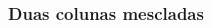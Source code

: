 \documentclass[aspectratio=169]{beamer}
\begin{document}
\begin{frame}[fragile] \frametitle{Duas colunas mescladas}
\vspace{-2em}
\begin{columns}[t]
\begin{column}{0.64\linewidth}
  \vskip6pt
  \begin{exampleblock}{}
  \end{exampleblock}
  \begin{columns}[t]
  \begin{column}{0.48\linewidth}
    \begin{block}{\lipsum[2][12]}
      \lipsum[3][1]
    \end{block}
  \end{column}
  \begin{column}{0.48\linewidth}
    \begin{block}{\lipsum[3][2]}
      \lipsum[3][3]
    \end{block}
  \end{column}
  \end{columns}
\end{column}
\begin{column}{0.32\linewidth}
  \begin{block}{\lipsum[3][4]}
    \lipsum[3][5-9]
  \end{block}
\end{column}
\end{columns}
\end{frame}

\end{document}
